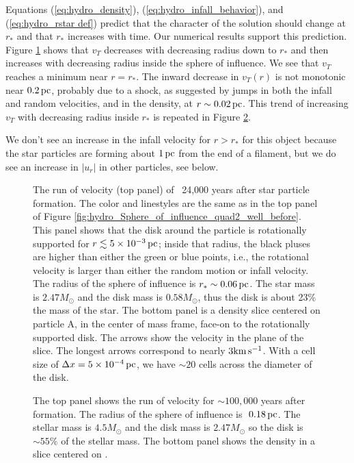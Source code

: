 \documentclass[../dissertation.tex]{subfiles}
\begin{document}
Equations (\ref{eq:hydro_density}), (\ref{eq:hydro_infall_behavior}), and (\ref{eq:hydro_rstar def})
predict that the 
character of the solution should change at $r_*$ and that $r_*$ 
increases with time. Our numerical results support this prediction.
Figure \ref{fig:hydro_Sphere_influence_quad2_just_after} shows that 
$v_T$ decreases with decreasing radius down to $r_*$ 
and then  increases with decreasing radius inside the sphere of influence. We see that $v_T$ reaches a minimum near $r=r_*$.  
The inward decrease in $v_T(r)$ is not monotonic near $0.2\,\rm pc$, probably due to a shock, 
as suggested by jumps in both the infall and random 
 velocities, and 
in the density, at $ r \sim 0.02 \,\rm pc$.
This trend of increasing $v_T$ with decreasing radius inside $r_*$ is repeated in Figure %
 \ref{fig:hydro_Sphere_influence_quad2_end_time}.

We don't see an increase in the infall velocity for $r > r_*$ for 
this object because the star particles are forming about $1 \,\rm pc$ from 
the end of a filament, but we do see an increase in $|u_r|$ in other 
particles, see below.
%
\begin{figure}[htb] %
\caption[Hydro Sphere of Influence 3]{\label{fig:hydro_Sphere_influence_quad2_just_after}The run of velocity (top panel) of \partA\ 24,000 years after 
star particle formation.
The color and linestyles are the same as in the top panel of Figure \ref{fig:hydro_Sphere_of_influence_quad2_well_before}.
This panel shows that the disk around the particle is rotationally supported for $r\lesssim 5\times10^{-3}\,\rm pc$; inside that radius, 
the black pluses are higher than either the green or blue points, i.e., the rotational velocity is larger than either the random motion%
or infall velocity.
The radius of the sphere of influence is $r_*\sim 0.06 \,\rm pc$.
The star mass is $2.47 M_\odot$ and the disk mass is $0.58 M_\odot$, 
thus the disk is about 23\% the mass of the star.
The bottom panel is a density slice centered on particle A, in the center of mass frame, face-on to the rotationally supported disk. 
The arrows show the velocity in the plane of the slice. 
The longest arrows correspond to nearly $3 {\rm km \, s^{-1}}$.
With a cell size of $\Delta x=5\times10^{-4}\,\rm pc$, we have $\sim 20$ cells across the diameter of the disk.
}

\end{figure}
%
\begin{figure}[htb] %
\caption[Hydro Sphere of Influence Other]{\label{fig:hydro_Sphere_influence_quad2_end_time}The top panel shows the run of velocity for \partB $\sim 100,000$ years after formation.  The radius of the sphere of influence is $~0.18 \,\rm pc$.  The stellar mass is $4.5 M_\odot$ and the disk mass is $2.47 M_\odot$ so the disk is $\sim 55\%$ of the
stellar mass. The bottom panel shows the density in a slice centered on \partB.}
\end{figure}
%
\end{document}
